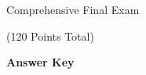 \documentclass{article}
\begin{document}
\begin{comment}

\vspace*{-3cm}

\begin{flushright}
Name: \hspace*{1in}

\medskip
(5 points) Student Number: \hspace*{1in}
\end{flushright}

\bigskip

\end{comment}

\begin{center}
\Large Comprehensive Final Exam \begin{EXAM}(120 Points Total)\end{EXAM} \begin{KEY}\textbf{Answer Key}\end{KEY}
\end{center}
\normalsize
\bigskip
\end{document}
